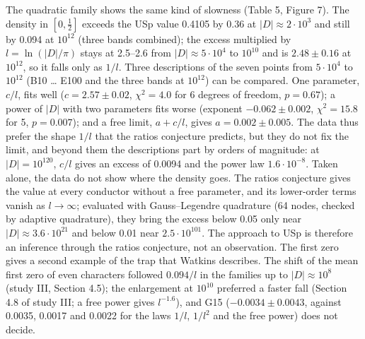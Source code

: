 \documentclass[
  10pt,
]{article}
\begin{document}
The quadratic family shows the same kind of slowness (Table 5, Figure
7). The density in \([0, \frac12]\) exceeds the USp value 0.4105 by 0.36
at \(|D| \approx 2\cdot10^3\) and still by 0.094 at \(10^{12}\) (three
bands combined); the excess multiplied by \(l = \ln(|D|/\pi)\) stays at
2.5--2.6 from \(|D| \approx 5\cdot10^4\) to \(10^{10}\) and is
\(2.48 \pm 0.16\) at \(10^{12}\), so it falls only as \(1/l\). Three
descriptions of the seven points from \(5\cdot10^4\) to \(10^{12}\) (B10
\ldots{} E100 and the three bands at \(10^{12}\)) can be compared. One
parameter, \(c/l\), fits well (\(c = 2.57 \pm 0.02\), \(\chi^2 = 4.0\)
for 6 degrees of freedom, \(p = 0.67\)); a power of \(|D|\) with two
parameters fits worse (exponent \(-0.062 \pm 0.002\), \(\chi^2 = 15.8\)
for 5, \(p = 0.007\)); and a free limit, \(a + c/l\), gives
\(a = 0.002 \pm 0.005\). The data thus prefer the shape \(1/l\) that the
ratios conjecture predicts, but they do not fix the limit, and beyond
them the descriptions part by orders of magnitude: at
\(|D| = 10^{120}\), \(c/l\) gives an excess of 0.0094 and the power law
\(1.6\cdot10^{-8}\). Taken alone, the data do not show where the density
goes. The ratios conjecture gives the value at every conductor without a
free parameter, and its lower-order terms vanish as \(l \to \infty\);
evaluated with Gauss--Legendre quadrature (64 nodes, checked by adaptive
quadrature), they bring the excess below 0.05 only near
\(|D| \approx 3.6\cdot10^{21}\) and below 0.01 near
\(2.5\cdot10^{101}\). The approach to USp is therefore an inference
through the ratios conjecture, not an observation. The first zero gives
a second example of the trap that Watkins describes. The shift of the
mean first zero of even characters followed \(0.094/l\) in the families
up to \(|D| \approx 10^8\) (study III, Section 4.5); the enlargement at
\(10^{10}\) preferred a faster fall (Section 4.8 of study III; a free
power gives \(l^{-1.6}\)), and G15 (\(-0.0034 \pm 0.0043\), against
0.0035, 0.0017 and 0.0022 for the laws \(1/l\), \(1/l^2\) and the free
power) does not decide.
\end{document}

